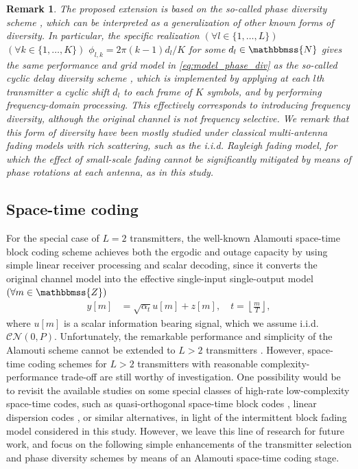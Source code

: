 \documentclass[10pt,journal,a4paper]{IEEEtran}
\newcommand{\stdset}[1]{\mathbbmss{#1}}	%
\newcommand{\CN}{\mathcal{CN}}			%
\newtheorem{remark}{Remark}
\begin{document}
\begin{remark}
The proposed extension is based on the so-called phase diversity scheme \cite{dammann2002low}, which can be interpreted as a generalization of other known forms of diversity. In particular, the specific realization $(\forall l \in\{1,\ldots,L\})$ $(\forall k\in \{1,\ldots,K\})$ $\phi_{l,k} = 2\pi (k-1)d_l/K$ for some $d_l \in \stdset{N}$ gives the same performance and grid model in \eqref{eq:model_phase_div} as the so-called cyclic delay diversity scheme \cite{dammann2002low}, which is implemented by applying at each $l$th transmitter a cyclic shift $d_l$ to each frame of $K$ symbols, and by performing frequency-domain processing. This effectively corresponds to introducing frequency diversity, although the original channel is not frequency selective. We remark that this form of diversity have been mostly studied under classical multi-antenna fading models with rich scattering, such as the i.i.d. Rayleigh fading model, for which the effect of small-scale fading cannot be significantly mitigated by means of phase rotations at each antenna, as in this study.   
\end{remark}

\subsection{Space-time coding}
For the special case of $L=2$ transmitters, the well-known Alamouti space-time block coding scheme \cite{alamouti1998} achieves both the ergodic and outage capacity by using simple linear receiver processing and scalar decoding, since it converts the original channel model into the effective single-input single-output model $(\forall m \in \stdset{Z})$
\begin{align*}
y[m] 
&= \sqrt{\alpha_t}u[m]+z[m], \quad t=\left\lfloor \frac{m}{T}\right\rfloor,
\end{align*}
where $u[m]$ is a scalar information bearing signal, which we assume i.i.d. $\CN(0,P)$. Unfortunately, the remarkable performance and simplicity of the Alamouti scheme cannot be extended to $L>2$ transmitters \cite{tarok1999space}. However, space-time coding schemes for $L>2$ transmitters with reasonable complexity-performance trade-off are still worthy of investigation. One possibility would be to revisit the available studies on some special classes of high-rate low-complexity space-time codes, such as quasi-orthogonal space-time block codes \cite{papadias2003capacity}, linear dispersion codes \cite{hassibi2002linear}, or similar alternatives, in light of the intermittent block fading model considered in this study. However, we leave this line of research for future work, and focus on the following simple enhancements of the transmitter selection and phase diversity schemes by means of an Alamouti space-time coding stage.
\end{document}
